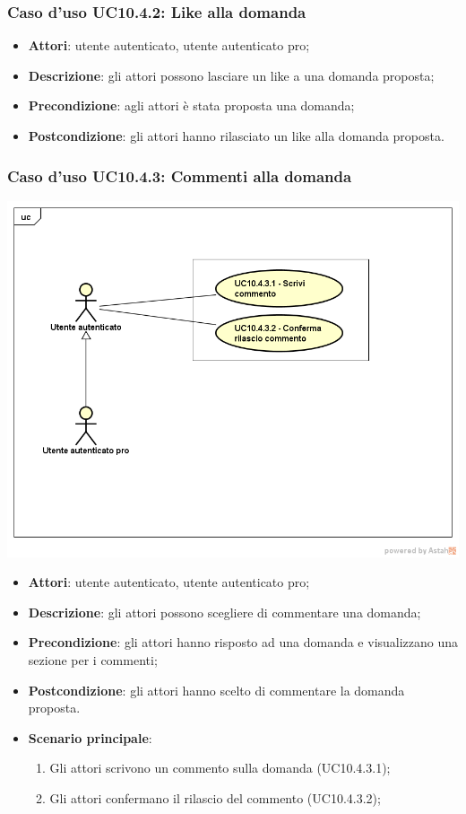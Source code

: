 \subsubsection{Caso d'uso UC10.4.2: Like alla domanda}
	\begin{itemize}
		\item \textbf{Attori}: utente autenticato, utente autenticato pro;
		\item \textbf{Descrizione}: gli attori possono lasciare un like a una domanda proposta;
		\item \textbf{Precondizione}: agli attori è stata proposta una domanda;
		\item \textbf{Postcondizione}: gli attori hanno rilasciato un like alla domanda proposta.
	\end{itemize}
\subsubsection{Caso d'uso UC10.4.3: Commenti alla domanda}
\begin{center}
	\includegraphics[scale=0.5]{UML/UC10_4_3.png}
\end{center}
	\begin{itemize}
		\item \textbf{Attori}: utente autenticato, utente autenticato pro;
		\item \textbf{Descrizione}: gli attori possono scegliere di commentare una domanda;
		\item \textbf{Precondizione}: gli attori hanno risposto ad una domanda e visualizzano una sezione per i commenti;
		\item \textbf{Postcondizione}: gli attori hanno scelto di commentare la domanda proposta.
		\item \textbf{Scenario principale}:
			\begin{enumerate}
				\item Gli attori scrivono un commento sulla domanda (UC10.4.3.1);
				\item Gli attori confermano il rilascio del commento (UC10.4.3.2);
			\end{enumerate}
	\end{itemize}
